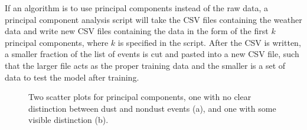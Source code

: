 \documentclass{article}
\begin{document}
If an algorithm is to use principal components instead of the raw data, a principal component analysis script will take the CSV files containing the weather data and write new CSV files containing the data in the form of the first $k$ principal components, where $k$ is specified in the script. After the CSV is written, a smaller fraction of the list of events is cut and pasted into a new CSV file, such that the larger file acts as the proper training data and the smaller is a set of data to test the model after training.
\pagebreak
\begin{figure}[H]
	\label{fig:pca}
	\caption{Two scatter plots for principal components, one with no clear distinction between dust and nondust events (a), and one with some visible distinction (b).}
\end{figure}
\pagebreak
\end{document}
